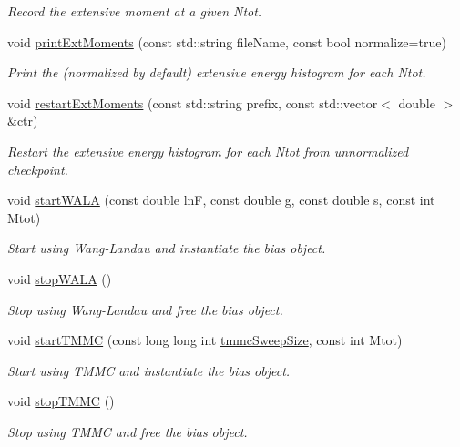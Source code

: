 \begin{DoxyCompactItemize}
\begin{DoxyCompactList}\small\item\em Record the extensive moment at a given Ntot. \end{DoxyCompactList}\item 
void \hyperlink{classsim_system_a2818b2f0ff79782d5443ca0f191564f8}{print\-Ext\-Moments} (const std\-::string file\-Name, const bool normalize=true)
\begin{DoxyCompactList}\small\item\em Print the (normalized by default) extensive energy histogram for each Ntot. \end{DoxyCompactList}\item 
void \hyperlink{classsim_system_a999556fea891765c5ed4d979706665af}{restart\-Ext\-Moments} (const std\-::string prefix, const std\-::vector$<$ double $>$ \&ctr)
\begin{DoxyCompactList}\small\item\em Restart the extensive energy histogram for each Ntot from unnormalized checkpoint. \end{DoxyCompactList}\item 
void \hyperlink{classsim_system_a57af66c88ce4dc1aeb6a1cd3f14ff0bb}{start\-W\-A\-L\-A} (const double ln\-F, const double g, const double s, const int Mtot)
\begin{DoxyCompactList}\small\item\em Start using Wang-\/\-Landau and instantiate the bias object. \end{DoxyCompactList}\item 
void \hyperlink{classsim_system_ad6febde00f19ae0787771f2d1d9e391b}{stop\-W\-A\-L\-A} ()
\begin{DoxyCompactList}\small\item\em Stop using Wang-\/\-Landau and free the bias object. \end{DoxyCompactList}\item 
void \hyperlink{classsim_system_ac689245cd8e9ddfdcd94d3871a5a5d6b}{start\-T\-M\-M\-C} (const long long int \hyperlink{classsim_system_a56e284a361964d0a9ce5c45f41d56ab1}{tmmc\-Sweep\-Size}, const int Mtot)
\begin{DoxyCompactList}\small\item\em Start using T\-M\-M\-C and instantiate the bias object. \end{DoxyCompactList}\item 
void \hyperlink{classsim_system_a69edcc2c27db3d4e94002ac5635e9030}{stop\-T\-M\-M\-C} ()
\begin{DoxyCompactList}\small\item\em Stop using T\-M\-M\-C and free the bias object. \end{DoxyCompactList}\item 

\end{DoxyCompactItemize}
